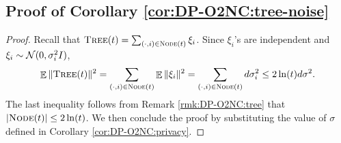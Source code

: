 \subsection{Proof of Corollary \ref{cor:DP-O2NC:tree-noise}}


\begin{proof}
Recall that ${\normalfont\textsc{Tree}}(t)=\sum_{(\cdot,i)\in{\normalfont\textsc{Node}}(t)} \xi_i$. Since $\xi_i$'s are independent and $\xi_i\sim {\cal N}(0,\sigma_i^2I)$,
\begin{equation*}
    \mathop{\mathbb{E}}\|{\normalfont\textsc{Tree}}(t)\|^2
    = \sum_{(\cdot,i)\in{\normalfont\textsc{Node}}(t)} \mathop{\mathbb{E}}\|\xi_i\|^2
    = \sum_{(\cdot,i)\in{\normalfont\textsc{Node}}(t)} d\sigma_i^2
    \le 2\ln(t) d\sigma^2.
\end{equation*}
The last inequality follows from Remark \ref{rmk:DP-O2NC:tree} that $|{\normalfont\textsc{Node}}(t)|\le 2\ln(t)$. We then conclude the proof by substituting the value of $\sigma$ defined in Corollary \ref{cor:DP-O2NC:privacy}.
\end{proof}